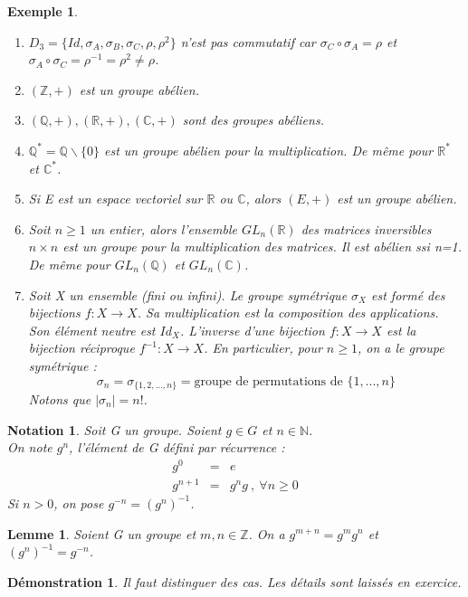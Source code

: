 \documentclass[a4paper, oneside]{report}
\theoremstyle{break}
\newtheorem{lemme}[thm]{Lemme}
\newtheorem{nota}[thm]{Notation}
\newtheorem{exem}[thm]{Exemple}
\newtheorem*{demo}{Démonstration}
\newcommand{\x}{\times}
\newcommand{\R}{\mathbb{R}}
\newcommand{\N}{\mathbb{N}}
\newcommand{\C}{\mathbb{C}}
\newcommand{\Z}{\mathbb{Z}}
\newcommand{\Q}{\mathbb{Q}}
\newcommand{\ev}{espace vectoriel }
\begin{document}
\begin{exem}
	\begin{enumerate}
		\item $D_3=\{Id, \sigma_A, \sigma_B, \sigma_C, \rho, \rho^2\}$ n'est pas commutatif car $\sigma_C \circ \sigma_A = \rho$ et $\sigma_A \circ \sigma_C = \rho^{-1} = \rho ^2 \neq \rho$.
		\item $(\Z, +)$ est un groupe abélien.
		\item $(\Q,+), (\R,+), (\C,+)$ sont des groupes abéliens.
		\item $\Q^*=\Q \backslash \{0\}$ est un groupe abélien pour la multiplication. De même pour $\R^*$ et $\C^*$.
		\item Si E est un \ev sur $\R$ ou $\C$, alors $(E,+)$ est un groupe abélien.
		\item Soit $n\geq 1$ un entier, alors l'ensemble $GL_n(\R)$ des matrices inversibles $n\x n$ est un groupe pour la multiplication des matrices. Il est abélien ssi n=1.\\
		De même pour $GL_n(\Q)$ et $GL_n(\C)$.\\
		\item Soit X un ensemble (fini ou infini). Le groupe symétrique $\sigma_X$ est formé des bijections $f:X\rightarrow X$. Sa multiplication est la composition des applications. Son élément neutre est $Id_X$. L'inverse d'une bijection $f:X\rightarrow X$ est la bijection réciproque $f^{-1}:X\rightarrow X$. En particulier, pour $n\geq 1$, on a le groupe symétrique :
		$$\sigma_n = \sigma_{\{1,2,...,n\}} = \text{groupe de permutations de } \{1,...,n\}$$
		Notons que $|\sigma_n|=n!$.
	\end{enumerate}	
\end{exem}

\begin{nota}
	Soit G un groupe. Soient $g\in G$ et $n\in \N$.\\
	On note $g^n$, l'élément de G défini par récurrence :
	$$\begin{array}{lll}
	g^0&=&e\\
	g^{n+1}&=&g^ng~,~\forall n \geq 0
	\end{array}$$
	Si $n>0$, on pose $g^{-n}=(g^n)^{-1}$.	
\end{nota}

\begin{lemme}
	Soient G un groupe et $m,n\in\Z$. On a $g^{m+n}=g^mg^n$ et $(g^n)^{-1}=g^{-n}$.
\end{lemme}
	

\begin{demo}
	Il faut distinguer des cas. Les détails sont laissés en exercice.	
\end{demo}
\end{document}
